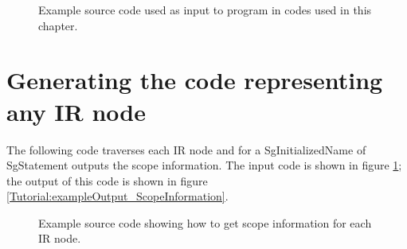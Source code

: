 \begin{figure}[!h]
{\indent
{\mySmallFontSize

\begin{latexonly}
   
\end{latexonly}

\begin{htmlonly}
   
\end{htmlonly}

}
}
\caption{Example source code used as input to program in
         codes used in this chapter.}
\label{Tutorial:exampleInputCode_ScopeInformation}
\end{figure}


\section{Generating the code representing any IR node}

    The following code traverses each IR node and for a 
SgInitializedName of SgStatement outputs the scope information.
The input code is shown in figure \ref{Tutorial:exampleInputCode_ScopeInformation};
the output of this code is shown in figure 
\ref{Tutorial:exampleOutput_ScopeInformation}.
    
\begin{figure}[!h]
{\indent
{\mySmallFontSize


\begin{latexonly}
   
\end{latexonly}

\begin{htmlonly}
   
\end{htmlonly}

}
}
\caption{Example source code showing how to get scope information for each IR node. }
\label{Tutorial:example_ScopeInformation}
\end{figure}



